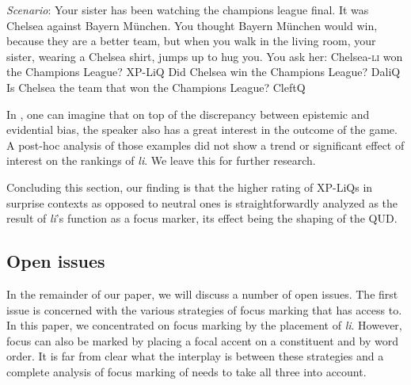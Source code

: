 \documentclass[output=paper,
colorlinks,
citecolor=brown,
newtxmath
]{langscibook}
\begin{document}

\eanoraggedright \label{interest}
\eanoraggedright \textit{Scenario}: Your sister has been watching the champions league final. It was Chelsea against Bayern München. You thought Bayern München would win, because they are a better team, but when you walk in the living room, your sister, wearing a Chelsea shirt, jumps up to hug you. You ask her:
\ex Chelsea-\textsc{li} won the Champions League? \hfill XP-LiQ
\ex Did Chelsea win the Champions League? \hfill DaliQ
\ex Is Chelsea the team that won the Champions League? \hfill CleftQ
\z\z

\noindent
In , one can imagine that on top of the discrepancy between epistemic and evidential bias, the speaker also has a great interest in the outcome of the game. A post-hoc analysis of those examples did not show a trend or significant effect of interest on the rankings of \textit{li}. We leave this for further research.

Concluding this section, our finding is that the higher rating of XP-LiQs in surprise contexts as opposed to neutral ones is straightforwardly analyzed as the result of \textit{li}'s function as a focus marker, its effect being the shaping of the QUD.

\subsection{Open issues}\label{sec:oi}
In the remainder of our paper, we will discuss a number of open issues. The first issue is concerned with the various strategies of focus marking that  has access to. In this paper, we concentrated on focus marking by the placement of \textit{li}. However, focus can also be marked by placing a focal accent on a constituent and by word order. It is far from clear what the interplay is between these strategies and a complete analysis of focus marking of  needs to take all three into account.

\end{document}
